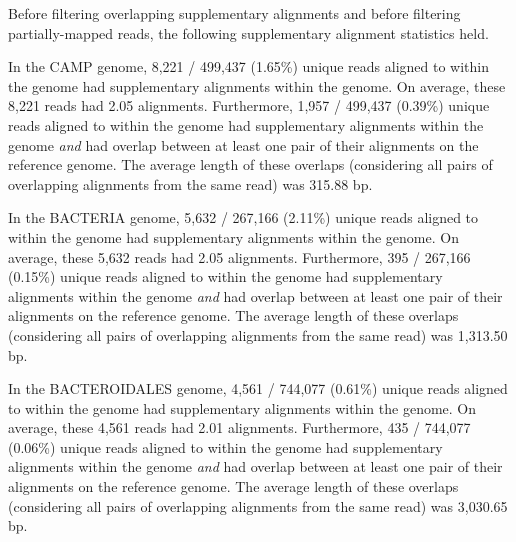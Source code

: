 Before filtering overlapping supplementary alignments and before filtering
partially-mapped reads, the following supplementary alignment statistics held.

In the CAMP genome, 8,221 / 499,437 (1.65\%) unique reads aligned to within the genome had supplementary alignments within the genome.
On average, these 8,221 reads had 2.05 alignments.
Furthermore, 1,957 / 499,437 (0.39\%) unique reads aligned to within the genome had supplementary alignments within the genome \emph{and} had overlap between at least one pair of their alignments on the reference genome.
The average length of these overlaps (considering all pairs of overlapping alignments from the same read) was 315.88 bp.

In the BACTERIA genome, 5,632 / 267,166 (2.11\%) unique reads aligned to within the genome had supplementary alignments within the genome.
On average, these 5,632 reads had 2.05 alignments.
Furthermore, 395 / 267,166 (0.15\%) unique reads aligned to within the genome had supplementary alignments within the genome \emph{and} had overlap between at least one pair of their alignments on the reference genome.
The average length of these overlaps (considering all pairs of overlapping alignments from the same read) was 1,313.50 bp.

In the BACTEROIDALES genome, 4,561 / 744,077 (0.61\%) unique reads aligned to within the genome had supplementary alignments within the genome.
On average, these 4,561 reads had 2.01 alignments.
Furthermore, 435 / 744,077 (0.06\%) unique reads aligned to within the genome had supplementary alignments within the genome \emph{and} had overlap between at least one pair of their alignments on the reference genome.
The average length of these overlaps (considering all pairs of overlapping alignments from the same read) was 3,030.65 bp.
\endinput
